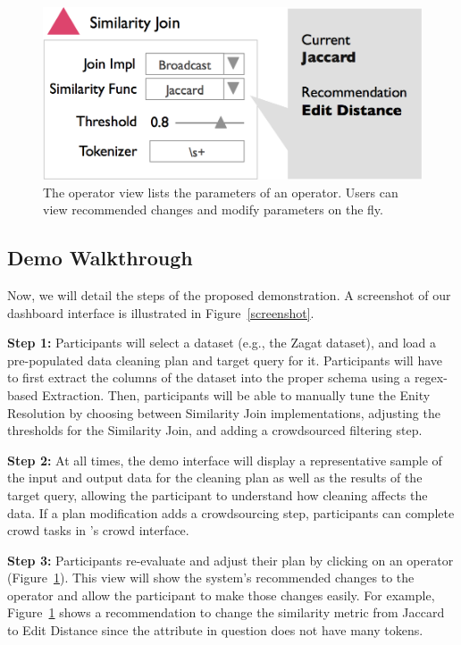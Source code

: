 \begin{figure}[t]
\centering
 \includegraphics[width=0.8\columnwidth]{figs/dashboard_recsys.png}
 \caption{The operator view lists the parameters of an operator. Users can view recommended changes and modify parameters on the fly.}
 \label{screenshot-rec}\vspace{-1.75em}
\end{figure}

\subsection{Demo Walkthrough}
Now, we will detail the steps of the proposed demonstration.
A screenshot of our dashboard interface is illustrated in Figure~\ref{screenshot}.

\vspace{0.2em}

\noindent\textbf{Step 1: } Participants will select a dataset (e.g., the Zagat dataset), and load a pre-populated data cleaning plan and target query for it.
Participants will have to first extract the columns of the dataset into the proper schema using a regex-based Extraction.
Then, participants will be able to manually tune the Enity Resolution by choosing between Similarity Join implementations, adjusting the thresholds for the Similarity Join, and adding a crowdsourced filtering step.

\vspace{0.2em}

\noindent\textbf{Step 2: } At all times, the demo interface will display a representative sample of the input and output data for the cleaning plan as well as the results of the target query, allowing the participant to understand how cleaning affects the data. 
If a plan modification adds a crowdsourcing step, participants can complete crowd tasks in \sys's crowd interface.

\vspace{0.2em}

\noindent\textbf{Step 3:} Participants re-evaluate and adjust their plan by clicking on an operator (Figure~\ref{screenshot-rec}).
This view will show the system's recommended changes to the operator and allow the participant to make those changes easily.
For example, Figure~\ref{screenshot-rec} shows a recommendation to change the similarity metric from Jaccard to Edit Distance since the attribute in question does not have many tokens.

